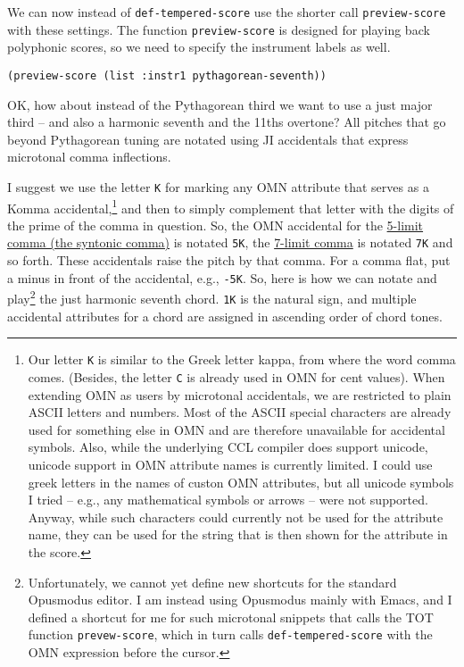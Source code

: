 \documentclass[11pt]{article}
\begin{document}
We can now instead of \texttt{def-tempered-score} use the shorter call \texttt{preview-score} with these
settings. The function \texttt{preview-score} is designed for playing back polyphonic scores, so we need
to specify the instrument labels as well.

\begin{verbatim}
(preview-score (list :instr1 pythagorean-seventh))
\end{verbatim}


OK, how about instead of the Pythagorean third we want to use a just major third -- and also a
harmonic seventh and the 11ths overtone? All pitches that go beyond Pythagorean tuning are
notated using JI accidentals that express microtonal comma inflections. 

I suggest we use the letter \texttt{K} for marking any OMN attribute that serves as a Komma
accidental,\footnote{Our letter \texttt{K} is similar to the Greek letter kappa, from where the word comma
comes. (Besides, the letter \texttt{C} is already used in OMN for cent values). When extending OMN as
users by microtonal accidentals, we are restricted to plain ASCII letters and numbers. Most of the
ASCII special characters are already used for something else in OMN and are therefore unavailable
for accidental symbols. Also, while the underlying CCL compiler does support unicode, unicode
support in OMN attribute names is currently limited. I could use greek letters in the names of
custon OMN attributes, but all unicode symbols I tried -- e.g., any mathematical symbols or arrows
-- were not supported. Anyway, while such characters could currently not be used for the attribute
name, they can be used for the string that is then shown for the attribute in the score.} and then
to simply complement that letter with the digits of the prime of the comma in question. So, the
OMN accidental for the \href{https://en.wikipedia.org/wiki/Syntonic\_comma}{5-limit comma (the syntonic comma)} is notated \texttt{5K}, the \href{https://en.wikipedia.org/wiki/Septimal\_comma }{7-limit comma} is
notated \texttt{7K} and so forth. These accidentals raise the pitch by that comma. For a comma flat, put
a minus in front of the accidental, e.g., \texttt{-5K}. So, here is how we can notate and play\footnote{Unfortunately, we cannot yet define new shortcuts for the standard Opusmodus editor. I am instead
using Opusmodus mainly with Emacs, and I defined a shortcut for me for such microtonal snippets
that calls the TOT function \texttt{prevew-score}, which in turn calls \texttt{def-tempered-score} with the OMN
expression before the cursor.} the just harmonic seventh chord.  \texttt{1K} is the natural sign, and
multiple accidental attributes for a chord are assigned in ascending order of chord tones.
\end{document}
